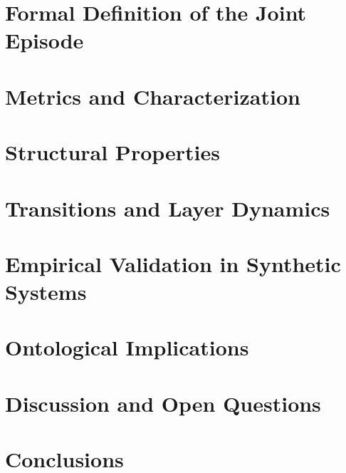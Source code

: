 \documentclass[11pt,a4paper]{article}
\begin{document}
\section{Formal Definition of the Joint Episode}

\section{Metrics and Characterization}

\section{Structural Properties}

\section{Transitions and Layer Dynamics}

\section{Empirical Validation in Synthetic Systems}

\section{Ontological Implications}

\section{Discussion and Open Questions}

\section{Conclusions}



\end{document}
